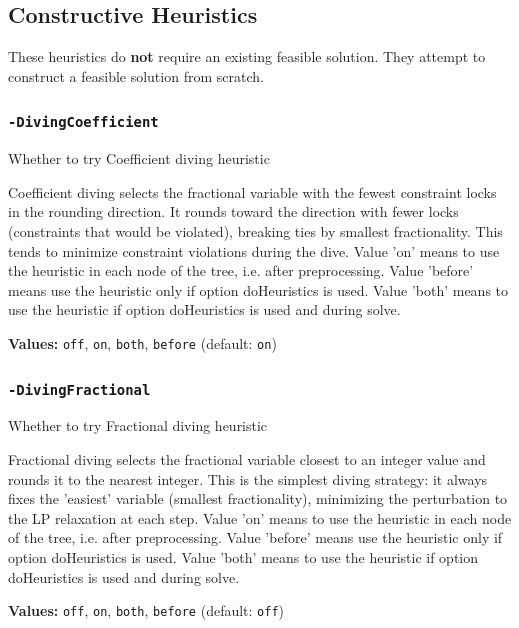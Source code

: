 \documentclass[11pt,a4paper]{article}
\begin{document}
\subsection{Constructive Heuristics}

These heuristics do \textbf{not} require an existing feasible solution. They attempt to construct a feasible solution from scratch.

\subsubsection*{\texttt{-DivingCoefficient}}

Whether to try Coefficient diving heuristic

Coefficient diving selects the fractional variable with the fewest constraint locks in the rounding direction. It rounds toward the direction with fewer locks (constraints that would be violated), breaking ties by smallest fractionality. This tends to minimize constraint violations during the dive. Value 'on' means to use the heuristic in each node of the tree, i.e. after preprocessing. Value 'before' means use the heuristic only if option doHeuristics is used. Value 'both' means to use the heuristic if option doHeuristics is used and during solve.

\textbf{Values:} \texttt{off}, \texttt{on}, \texttt{both}, \texttt{before} (default: \texttt{on})

\subsubsection*{\texttt{-DivingFractional}}

Whether to try Fractional diving heuristic

Fractional diving selects the fractional variable closest to an integer value and rounds it to the nearest integer. This is the simplest diving strategy: it always fixes the 'easiest' variable (smallest fractionality), minimizing the perturbation to the LP relaxation at each step. Value 'on' means to use the heuristic in each node of the tree, i.e. after preprocessing. Value 'before' means use the heuristic only if option doHeuristics is used. Value 'both' means to use the heuristic if option doHeuristics is used and during solve.

\textbf{Values:} \texttt{off}, \texttt{on}, \texttt{both}, \texttt{before} (default: \texttt{off})
\end{document}
